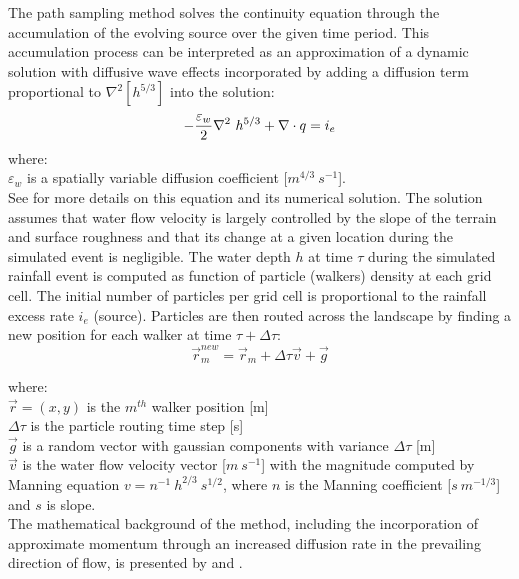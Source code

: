 \documentclass[gmd, manuscript]{copernicus}
\begin{document}
\noindent
The path sampling method solves the continuity equation 
through the accumulation of the evolving source over the given time period. 
This accumulation process can be interpreted as
an approximation of a dynamic solution with diffusive wave effects
incorporated by adding a diffusion term proportional to
$ \nabla^2 [h^{5/3}]$
into the solution:
\begin{equation}
\label{eq:difwater}
-{\varepsilon_w\over 2 }\nabla^2 ~ h^{5/3}
+\nabla \cdot \vec{q} = i_e
\end{equation}
{\small
\noindent
 where: \\
 \noindent
 \hspace*{0.5em} $\varepsilon_w$ is a spatially variable diffusion coefficient [$\unit{m}^{4/3}~\unit{s}^{-1}$]. \\
}
See \cite{Mitasova2004} for more details 
on this equation and its numerical solution.
The solution assumes that water flow velocity 
is largely controlled by the slope of the terrain and surface roughness 
and that its change at a given location during the simulated event is negligible. 
The water depth $h$ at time $\tau$ during the simulated rainfall event
 is computed as function of particle (walkers) density at each grid cell. 
The initial number of particles per grid cell 
is proportional to the rainfall excess rate $i_e$ (source).
Particles are then routed across the landscape 
by finding a new position for each walker at time $\tau + \Delta \tau$:
\begin{equation}
\vec{r}_m^{new}=\vec{r}_m + \Delta \tau \vec{v} + \vec{g}
\end{equation}

{\small
\noindent
where: \\
\noindent
\hspace*{0.5em} $\vec{r} = (x, y)$ is the $m^{th}$ walker position [\unit{m}]\\
\hspace*{0.5em} $\Delta \tau$ is the particle routing time step [\unit{s}]\\
\hspace*{0.5em} $\vec{g}$ is a random vector with gaussian components with variance $\Delta \tau$ [\unit{m}]\\
\hspace*{0.5em} $\vec{v} $ is the water flow velocity vector [$\unit{m~s^{-1}}$]
with the magnitude computed by Manning equation $v=n^{-1}~h^{2/3}~s^{1/2}$, 
where $n$ is the Manning coefficient [$\unit{s~m^{-1/3}}$] and $s$ is slope.\\ 
}
%
\noindent
The mathematical background of the method,
including the incorporation of approximate momentum 
through an increased diffusion rate in the prevailing direction of flow,
is presented by \cite{Mitas1998} and \cite{Mitasova2004}.
\end{document}
